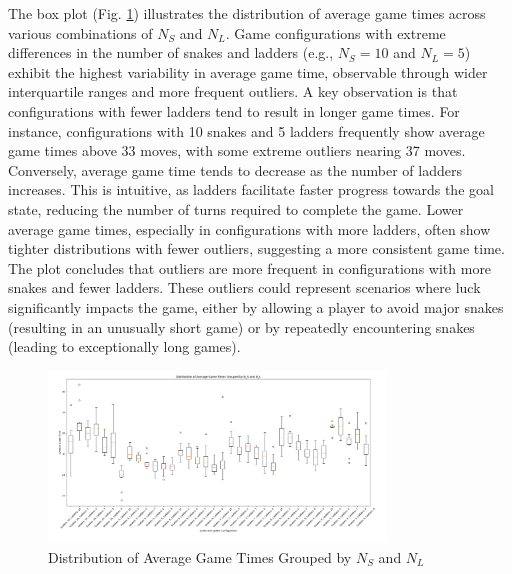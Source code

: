 \documentclass[12pt]{report}
\begin{document}
	The box plot (Fig. \ref{fig:boxplots}) illustrates the distribution of average game times across various combinations of $N_S$ and $N_L$. Game configurations with extreme differences in the number of snakes and ladders (e.g., $N_S = 10$ and $N_L = 5$) exhibit the highest variability in average game time, observable through wider interquartile ranges and more frequent outliers. A key observation is that configurations with fewer ladders tend to result in longer game times. For instance, configurations with 10 snakes and 5 ladders frequently show average game times above 33 moves, with some extreme outliers nearing 37 moves. Conversely, average game time tends to decrease as the number of ladders increases. This is intuitive, as ladders facilitate faster progress towards the goal state, reducing the number of turns required to complete the game. Lower average game times, especially in configurations with more ladders, often show tighter distributions with fewer outliers, suggesting a more consistent game time. The plot concludes that outliers are more frequent in configurations with more snakes and fewer ladders. These outliers could represent scenarios where luck significantly impacts the game, either by allowing a player to avoid major snakes (resulting in an unusually short game) or by repeatedly encountering snakes (leading to exceptionally long games).
	
	\begin{figure}[th]
		\centering
		\includegraphics[width=0.8\textwidth]{"../Chapter 1/BoxPlots"}
		\caption{Distribution of Average Game Times Grouped by $N_S$ and $N_L$}
		\label{fig:boxplots}
	\end{figure}
	
\end{document}
